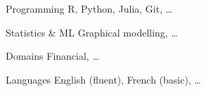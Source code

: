 
\begin{cvskills}

  \cvskill
    {Programming}
    {R, Python, Julia, Git, \dots}

  \cvskill
    {Statistics \& ML}
    {Graphical modelling, \dots}

  \cvskill
    {Domains}
    {Financial, \dots}

  \cvskill
    {Languages}
    {English (fluent), French (basic), \dots}

\end{cvskills}
